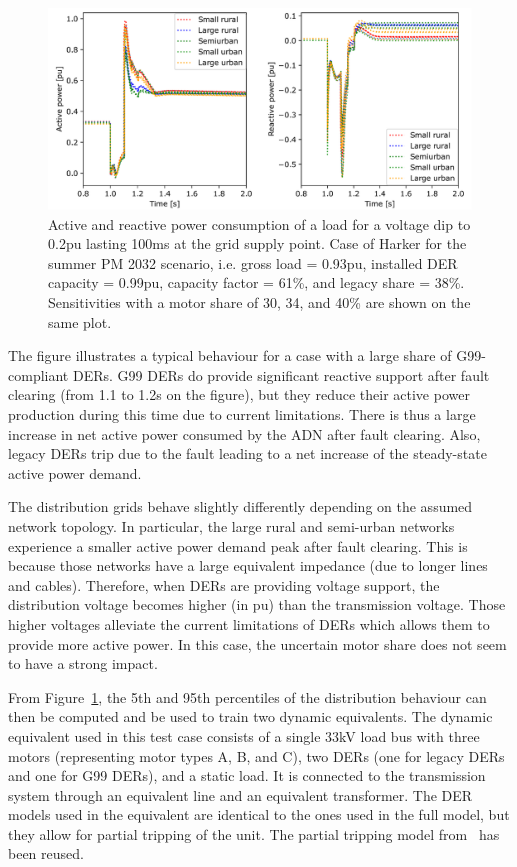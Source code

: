 \begin{figure}
    \centering
    \includegraphics[width=\linewidth]{Figs/CIGRE_equiv.png}
    \caption{Active and reactive power consumption of a load for a voltage dip to 0.2pu lasting 100ms at the grid supply point. Case of Harker for the summer PM 2032 scenario, i.e. gross load = 0.93pu, installed DER capacity = 0.99pu, capacity factor = 61\%, and legacy share = 38\%. Sensitivities with a motor share of 30, 34, and 40\% are shown on the same plot.}
    \label{fig:CIGRE_equiv}
\end{figure}

The figure illustrates a typical behaviour for a case with a large share of G99-compliant DERs. G99 DERs do provide significant reactive support after fault clearing (from 1.1 to 1.2s on the figure), but they reduce their active power production during this time due to current limitations. There is thus a large increase in net active power consumed by the ADN after fault clearing. Also, legacy DERs trip due to the fault leading to a net increase of the steady-state active power demand.

The distribution grids behave slightly differently depending on the assumed network topology. In particular, the large rural and semi-urban networks experience a smaller active power demand peak after fault clearing. This is because those networks have a large equivalent impedance (due to longer lines and cables). Therefore, when DERs are providing voltage support, the distribution voltage becomes higher (in pu) than the transmission voltage. Those higher voltages alleviate the current limitations of DERs which allows them to provide more active power. In this case, the uncertain motor share does not seem to have a strong impact.

From Figure~\ref{fig:CIGRE_equiv}, the 5th and 95th percentiles of the distribution behaviour can then be computed and be used to train two dynamic equivalents. The dynamic equivalent used in this test case consists of a single 33kV load bus with three motors (representing motor types A, B, and C), two DERs (one for legacy DERs and one for G99 DERs), and a static load. It is connected to the transmission system through an equivalent line and an equivalent transformer. The DER models used in the equivalent are identical to the ones used in the full model, but they allow for partial tripping of the unit. The partial tripping model from~\cite{ChaspierreThesis} has been reused.


